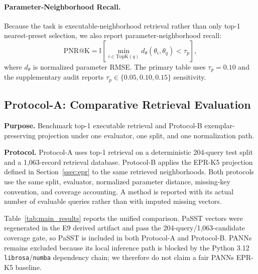 \paragraph{Parameter-Neighborhood Recall.}
Because the task is executable-neighborhood retrieval rather than only top-1 nearest-preset selection, we also report parameter-neighborhood recall:
\begin{equation}
	\mathrm{PNR@K}=
	\mathbb{I}\left[\min_{i\in\mathrm{TopK}(q)}d_\theta(\theta_i,\theta_q)<\tau_p\right],
\end{equation}
where $d_\theta$ is normalized parameter RMSE. The primary table uses $\tau_p=0.10$ and the supplementary audit reports $\tau_p\in\{0.05,0.10,0.15\}$ sensitivity.

\subsection{Protocol-A: Comparative Retrieval Evaluation}
\label{ssec:protocolA}

\textbf{Purpose.} Benchmark top-1 executable retrieval and Protocol-B exemplar-preserving projection under one evaluator, one split, and one normalization path.

\textbf{Protocol.} Protocol-A uses top-1 retrieval on a deterministic 204-query test split and a 1,063-record retrieval database. Protocol-B applies the EPR-K5 projection defined in Section~\ref{ssec:epr} to the same retrieved neighborhoods. Both protocols use the same split, evaluator, normalized parameter distance, missing-key convention, and coverage accounting. A method is reported with its actual number of evaluable queries rather than with imputed missing vectors.

Table~\ref{tab:main_results} reports the unified comparison. PaSST vectors were regenerated in the E9 derived artifact and pass the 204-query/1,063-candidate coverage gate, so PaSST is included in both Protocol-A and Protocol-B. PANNs remains excluded because its local inference path is blocked by the Python 3.12 \texttt{librosa}/\texttt{numba} dependency chain; we therefore do not claim a fair PANNs EPR-K5 baseline.

